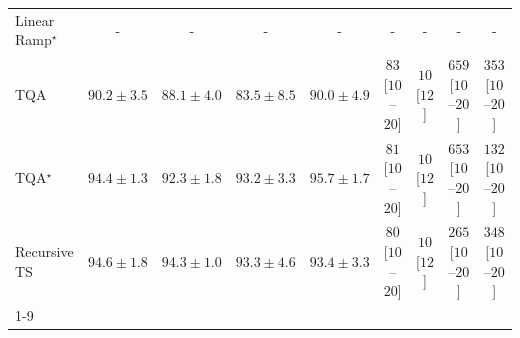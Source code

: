 \begin{tabular}{l|cccc|cccc|}
Linear Ramp$^\star$ & {\cellcolor[HTML]{000000}} \color[HTML]{F1F1F1} {\cellcolor{white}} \color{black} - & {\cellcolor[HTML]{000000}} \color[HTML]{F1F1F1} {\cellcolor{white}} \color{black} - & {\cellcolor[HTML]{000000}} \color[HTML]{F1F1F1} {\cellcolor{white}} \color{black} - & {\cellcolor[HTML]{000000}} \color[HTML]{F1F1F1} {\cellcolor{white}} \color{black} - & {\cellcolor[HTML]{000000}} \color[HTML]{F1F1F1} {\cellcolor{white}} \color{black} - & {\cellcolor[HTML]{000000}} \color[HTML]{F1F1F1} {\cellcolor{white}} \color{black} - & {\cellcolor[HTML]{000000}} \color[HTML]{F1F1F1} {\cellcolor{white}} \color{black} - & {\cellcolor[HTML]{000000}} \color[HTML]{F1F1F1} {\cellcolor{white}} \color{black} - \\
TQA & {\cellcolor[HTML]{3991C1}} \color[HTML]{F1F1F1} $90.2\pm 3.5$ & {\cellcolor[HTML]{69A5CC}} \color[HTML]{F1F1F1} $88.1\pm 4.0$ & {\cellcolor[HTML]{BCC7E1}} \color[HTML]{000000} $83.5\pm 8.5$ & {\cellcolor[HTML]{3D93C2}} \color[HTML]{F1F1F1} $90.0\pm 4.9$ & {\cellcolor[HTML]{FDE4E0}} \color[HTML]{000000} $83$ [$10$--$20$] & {\cellcolor[HTML]{FFF7F3}} \color[HTML]{000000} $10$ [$12$] & {\cellcolor[HTML]{55006D}} \color[HTML]{F1F1F1} $659$ [$10$--$20$] & {\cellcolor[HTML]{F564A0}} \color[HTML]{F1F1F1} $353$ [$10$--$20$] \\
TQA$^\star$ & {\cellcolor[HTML]{04649E}} \color[HTML]{F1F1F1} $94.4\pm 1.3$ & {\cellcolor[HTML]{1278B4}} \color[HTML]{F1F1F1} $92.3\pm 1.8$ & {\cellcolor[HTML]{056EAD}} \color[HTML]{F1F1F1} $93.2\pm 3.3$ & {\cellcolor[HTML]{045A8D}} \color[HTML]{F1F1F1} $95.7\pm 1.7$ & {\cellcolor[HTML]{FDE4E0}} \color[HTML]{000000} $81$ [$10$--$20$] & {\cellcolor[HTML]{FFF7F3}} \color[HTML]{000000} $10$ [$12$] & {\cellcolor[HTML]{58006E}} \color[HTML]{F1F1F1} $653$ [$10$--$20$] & {\cellcolor[HTML]{FDD4D0}} \color[HTML]{000000} $132$ [$10$--$20$] \\
Recursive TS & {\cellcolor[HTML]{04639B}} \color[HTML]{F1F1F1} $94.6\pm 1.8$ & {\cellcolor[HTML]{05659F}} \color[HTML]{F1F1F1} $94.3\pm 1.0$ & {\cellcolor[HTML]{056DAC}} \color[HTML]{F1F1F1} $93.3\pm 4.6$ & {\cellcolor[HTML]{056DAB}} \color[HTML]{F1F1F1} $93.4\pm 3.3$ & {\cellcolor[HTML]{FDE4E1}} \color[HTML]{000000} $80$ [$10$--$20$] & {\cellcolor[HTML]{FFF7F3}} \color[HTML]{000000} $10$ [$12$] & {\cellcolor[HTML]{FA9DB4}} \color[HTML]{000000} $265$ [$10$--$20$] & {\cellcolor[HTML]{F767A1}} \color[HTML]{F1F1F1} $348$ [$10$--$20$] \\
\cline{1-9}
\bottomrule
\end{tabular}
